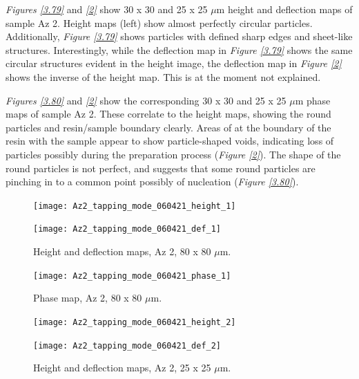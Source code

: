 \textit{Figures \ref{3.79}} and \textit{\ref{2}} show 30 x 30 and 25 x 25 $\mu$m height and deflection maps of sample Az 2. Height maps (left) show almost perfectly circular particles. Additionally, \textit{Figure \ref{3.79}} shows particles with defined sharp edges and sheet-like structures. Interestingly, while the deflection map in \textit{Figure \ref{3.79}} shows the same circular structures evident in the height image, the deflection map in \textit{Figure \ref{2}} shows the inverse of the height map. This is at the moment not explained. 

\textit{Figures \ref{3.80}} and \textit{\ref{2}} show the corresponding 30 x 30 and 25 x 25 $\mu$m phase maps of sample Az 2. These correlate to the height maps, showing the round particles and resin/sample boundary clearly. Areas of at the boundary of the resin with the sample appear to show particle-shaped voids, indicating loss of particles possibly during the preparation process (\textit{Figure \ref{2}}). The shape of the round particles is not perfect, and suggests that some round particles are pinching in to a common point possibly of nucleation (\textit{Figure \ref{3.80}}). 


\begin{figure}[H]
\centering
\begin{minipage}{.45\textwidth}
  \centering
  \texttt{[image: Az2\_tapping\_mode\_060421\_height\_1]}
\end{minipage}
\begin{minipage}{.45\textwidth}
  \centering
  \texttt{[image: Az2\_tapping\_mode\_060421\_def\_1]}
\end{minipage}
\caption[Height and deflection maps, Az 2]{Height and deflection maps, Az 2, 80 x 80 $\mu$m.}
\label{fig:afm_az2_height_def_1}
\end{figure}

\begin{figure}[H]
\centering
  \texttt{[image: Az2\_tapping\_mode\_060421\_phase\_1]}
\caption[Phase map, Az 2]{Phase map, Az 2, 80 x 80 $\mu$m.}
\label{fig:afm_az2_phase_1}
\end{figure}

\begin{figure}[H]
\centering
\begin{minipage}{.45\textwidth}
  \centering
  \texttt{[image: Az2\_tapping\_mode\_060421\_height\_2]}
\end{minipage}
\begin{minipage}{.45\textwidth}
  \centering
  \texttt{[image: Az2\_tapping\_mode\_060421\_def\_2]}
\end{minipage}
\caption[Height and deflection maps, Az 2]{Height and deflection maps, Az 2, 25 x 25 $\mu$m.}
\label{fig:afm_az2_height_def_2}
\end{figure}

